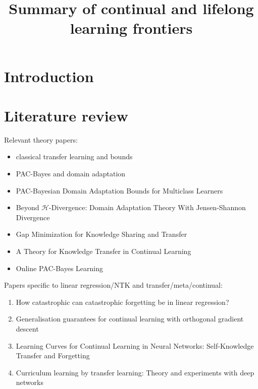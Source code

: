 \documentclass[letterpaper]{article}
\title{Summary of continual and lifelong learning frontiers}
\theoremstyle{definition}
\begin{document}
	
	\maketitle
	

\tableofcontents

 
\section{Introduction}
	

\section{Literature review}

Relevant theory papers:

\begin{itemize}
	\item classical transfer learning and bounds
	\item PAC-Bayes and domain adaptation \citep{germain2020pac}
	\item PAC-Bayesian Domain Adaptation Bounds for Multiclass Learners \citep{sicilia2022pac}
	\item Beyond $\mathcal{H}$-Divergence: Domain Adaptation Theory With Jensen-Shannon Divergence \citep{shui2020beyond}
	\item Gap Minimization for Knowledge Sharing and Transfer \citep{wang2022gap}
	\item A Theory for Knowledge Transfer in Continual Learning \citep{benavides2022theory}
	\item Online PAC-Bayes Learning \citep{haddouche2022online}
\end{itemize}

Papers specific to linear regression/NTK and transfer/meta/continual:
\begin{enumerate}
	\item How catastrophic can catastrophic forgetting be in linear regression? \citep{evron2022catastrophic}
	\item Generalisation guarantees for continual learning with orthogonal gradient descent \citep{bennani2020generalisation}
	\item  Learning Curves for Continual Learning in Neural Networks: Self-Knowledge Transfer and Forgetting \citep{karakida2021learning}
	\item Curriculum learning by transfer learning: Theory and experiments with deep networks \citep{weinshall2018curriculum}
\end{enumerate}
\end{document}
